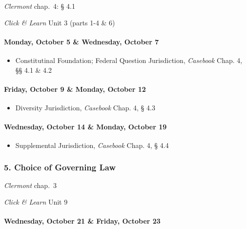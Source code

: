 \documentclass[11pt,letterpaper,twoside]{article}
\providecommand{\tightlist}{%
\setlength{\itemsep}{0em}\setlength{\parskip}{0em}\setlength{\itemindent}{0em}}
\begin{document}
\emph{Clermont} chap.~4: § 4.1

\emph{Click \& Learn} Unit 3 (parts 1-4 \& 6)

\paragraph{Monday, October 5 \& Wednesday, October
7}\label{monday-october-5-wednesday-october-7}

\begin{itemize}
\tightlist
\item
  Constitutinal Foundation; Federal Question Jurisdiction,
  \emph{Casebook} Chap. 4, §§ 4.1 \& 4.2
\end{itemize}

\paragraph{Friday, October 9 \& Monday, October
12}\label{friday-october-9-monday-october-12}

\begin{itemize}
\tightlist
\item
  Diversity Jurisdiction, \emph{Casebook} Chap. 4, § 4.3
\end{itemize}

\paragraph{Wednesday, October 14 \& Monday, October
19}\label{wednesday-october-14-monday-october-19}

\begin{itemize}
\tightlist
\item
  Supplemental Jurisdiction, \emph{Casebook} Chap. 4, § 4.4
\end{itemize}

\subsubsection{5. Choice of Governing
Law}\label{choice-of-governing-law}

\emph{Clermont} chap.~3

\emph{Click \& Learn} Unit 9

\paragraph{Wednesday, October 21 \& Friday, October
23}\label{wednesday-october-21-friday-october-23}
\end{document}
